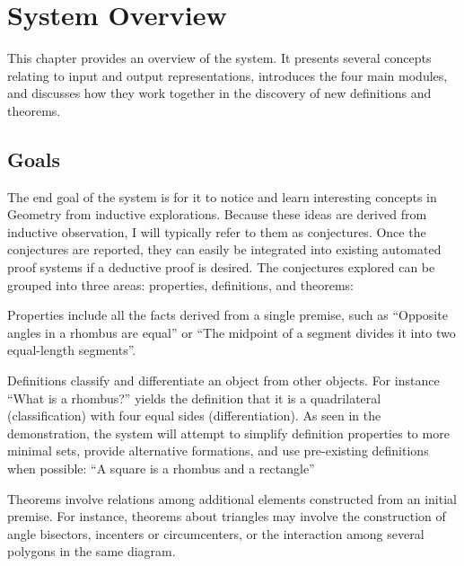 \chapter{System Overview}
\label{chap:sys-overview}

This chapter provides an overview of the system. It presents several
concepts relating to input and output representations, introduces the
four main modules, and discusses how they work together in the
discovery of new definitions and theorems.

\section{Goals}

The end goal of the system is for it to notice and learn interesting
concepts in Geometry from inductive explorations. Because these ideas
are derived from inductive observation, I will typically refer to them
as conjectures. Once the conjectures are reported, they can easily be
integrated into existing automated proof systems if a deductive proof
is desired. The conjectures explored can be grouped into three areas:
properties, definitions, and theorems:

\begin{description}

\enlargethispage*{-\baselineskip}

\item[Properties] Properties include all the facts derived from a
  single premise, such as ``Opposite angles in a rhombus are equal''
  or ``The midpoint of a segment divides it into two equal-length
  segments''.

\item[Definitions] Definitions classify and differentiate an object
  from other objects. For instance ``What is a rhombus?'' yields the
  definition that it is a quadrilateral (classification) with four
  equal sides (differentiation). As seen in the demonstration, the
  system will attempt to simplify definition properties to more
  minimal sets, provide alternative formations, and use pre-existing
  definitions when possible: ``A square is a rhombus and a rectangle''

\item[Theorems] Theorems involve relations among additional elements
  constructed from an initial premise. For instance, theorems about
  triangles may involve the construction of angle bisectors, incenters
  or circumcenters, or the interaction among several polygons in the
  same diagram.

\end{description}

